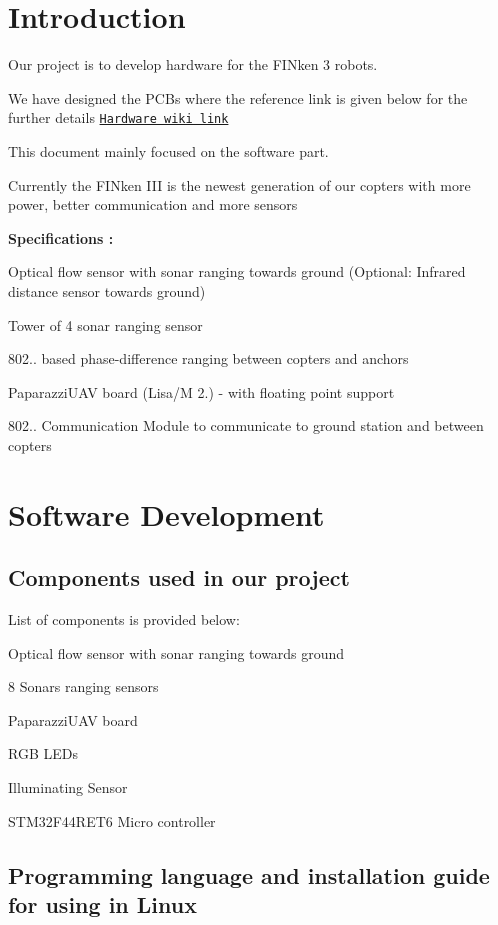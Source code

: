 \hypertarget{index_intro_sec}{}\section{Introduction}\label{index_intro_sec}
Our project is to develop hardware for the F\+I\+Nken 3 robots.

We have designed the P\+C\+Bs where the reference link is given below for the further details \href{https://github.com/ovgu-FINken/DE-HW-Hardware/wiki}{\tt Hardware wiki link}

This document mainly focused on the software part.

Currently the F\+I\+Nken I\+II is the newest generation of our copters with more power, better communication and more sensors 

{\bfseries Specifications \+:}


\begin{DoxyEnumerate}
\item Optical flow sensor with sonar ranging towards ground (Optional\+: Infrared distance sensor towards ground)
\item Tower of 4 sonar ranging sensor
\item 802.. based phase-\/difference ranging between copters and anchors
\item Paparazzi\+U\+AV board (Lisa/M 2.) -\/ with floating point support
\item 802.. Communication Module to communicate to ground station and between copters
\end{DoxyEnumerate}\hypertarget{index_Software_sec}{}\section{Software Development}\label{index_Software_sec}


\hypertarget{index_comp_sec}{}\subsection{Components used in our project}\label{index_comp_sec}




List of components is provided below\+:


\begin{DoxyEnumerate}
\item Optical flow sensor with sonar ranging towards ground
\item 8 Sonars ranging sensors
\item Paparazzi\+U\+AV board
\item R\+GB L\+E\+Ds
\item Illuminating Sensor
\item S\+T\+M32\+F44\+R\+E\+T6 Micro controller 

 
\end{DoxyEnumerate}\hypertarget{index_prog_sec}{}\subsection{Programming language and installation guide for using in Linux}\label{index_prog_sec}




